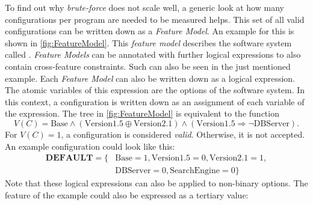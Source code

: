 To find out why \textit{brute-force} does not scale well, a generic look at how many configurations per program are needed to be measured helps. This set of all valid configurations can be written down as a \textit{Feature Model}. An example for this is shown in \cref{fig:FeatureModel}. This \textit{feature model} describes the software system called . \textit{Feature Models} can be annotated with further logical expressions to also contain cross-feature constraints. Such can also be seen in the just mentioned example. Each \textit{Feature Model} can also be written down as a logical expression. The atomic variables of this expression are the options of the software system. In this context, a configuration is written down as an assignment of each variable of the expression. The tree in \cref{fig:FeatureModel} is equivalent to the function
\begin{equation*}
	V(C)= \text{Base} \land (\text{Version1.5} \oplus \text{Version2.1}) \land (\text{Version1.5} \Rightarrow \neg \text{DBServer}).%
\end{equation*}
For $V(C)=1$, a configuration is considered \textit{valid}. Otherwise, it is not accepted.
An example configuration could look like this:
\begin{align*}
	\textbf{DEFAULT} =  \{&\text{Base} = 1, \text{Version1.5}=0, \text{Version2.1} = 1, \\
	&\text{DBServer} =0, \text{SearchEngine} =0 \}
\end{align*}
Note that these logical expressions can also be applied to non-binary options. The feature  of the example could also be expressed as a tertiary value:

